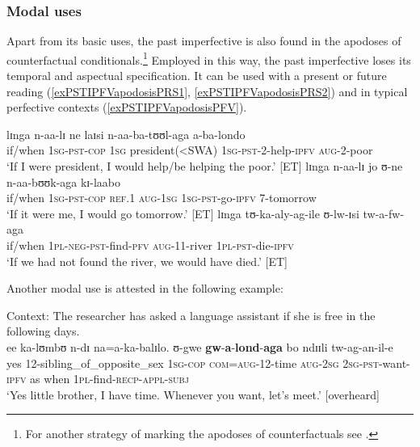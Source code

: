 \subsubsection{Modal uses}\label{PastImperfectiveModal}
Apart from its basic uses, the past imperfective is also found in the apodoses of counterfactual conditionals.\footnote{For another strategy of marking the apodoses of counterfactuals see .} Employed in this way, the past imperfective loses its temporal and aspectual specification. It can be used with a present or future reading (\ref{exPSTIPFVapodosisPRS1}, \ref{exPSTIPFVapodosisPRS2}) and in typical perfective contexts (\ref{exPSTIPFVapodosisPFV}).

\begin{exe}
\ex \label{exPSTIPFVapodosisPRS1} \gll lɪnga n-aa-lɪ ne laɪsi n-aa-ba-tʊʊl-aga a-ba-londo\\
if/when \textsc{1sg}-\textsc{pst}-\textsc{cop} \textsc{1sg} president(<SWA) \textsc{1sg}-\textsc{pst}-2-help-\textsc{ipfv} \textsc{aug}-2-poor\\
\glt `If I were president, I would help/be helping the poor.' [ET]
\ex \label{exPSTIPFVapodosisPRS2} \gll lɪnga n-aa-lɪ jo ʊ-ne n-aa-bʊʊk-aga kɪ-laabo\\
if/when \textsc{1sg}-\textsc{pst}-\textsc{cop} \textsc{ref.1} \textsc{aug}-\textsc{1sg} \textsc{1sg}-\textsc{pst}-go-\textsc{ipfv} 7-tomorrow\\
\glt \lq If it were me, I would go tomorrow.' [ET]
\ex \label{exPSTIPFVapodosisPFV} \gll lɪnga tʊ-ka-aly-ag-ile ʊ-lw-ɪsi tw-a-fw-aga\\
if/when \textsc{1pl}-\textsc{neg}-\textsc{pst}-find-\textsc{pfv} \textsc{aug}-11-river \textsc{1pl}-\textsc{pst}-die-\textsc{ipfv}\\
\glt `If we had not found the river, we would have died.' [ET]
\end{exe}

Another modal use is attested in the following example:

\begin{exe}
\ex Context: The researcher has asked a language assistant if she is free in the following days.\\
\gll ee ka-lʊmbʊ n-dɪ na=a-ka-balɪlo. ʊ-gwe \textbf{gw}-\textbf{a}-\textbf{lond}-\textbf{aga} bo ndɪɪli tw-ag-an-il-e\\
yes 12-sibling\_of\_opposite\_sex \textsc{1sg}-\textsc{cop} \textsc{com}=\textsc{aug}-12-time \textsc{aug}-\textsc{2sg} \textsc{2sg}-\textsc{pst}-want-\textsc{ipfv} as when \textsc{1pl}-find-\textsc{recp}-\textsc{appl}-\textsc{subj}\\
\glt \lq Yes little brother, I have time. Whenever you want, let's meet.' [overheard]
\end{exe}
